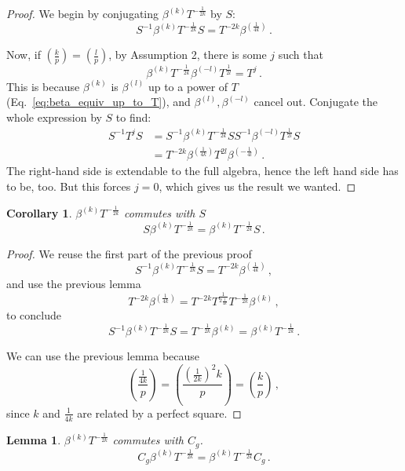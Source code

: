 \documentclass[aps,twocolumn,prx,floatfix,preprintnumbers, nofootinbib,10pt]{revtex4-2}
\numberwithin{equation}{section}
\newtheorem{lemma}[theorem]{Lemma}
\newtheorem{corollary}[theorem]{Corollary}
\theoremstyle{definition}
\theoremstyle{remark}
\theoremstyle{claim}
\newcommand{\be}{\begin{equation}}
\newcommand{\ee}{\end{equation}}
\newcommand{\paren}[1]{\left( #1 \right)}
\begin{document}
\begin{proof}
 We begin by conjugating $\beta^{(k)} T^{-\frac{1}{2k}}$ by $S$:
 \be
 S^{-1} \beta^{(k)} T^{-\frac{1}{2k}} S = T^{-2k} \beta^{(\frac{1}{4k})} \,.
 \ee


 Now, if $\paren{\frac{k}{p}} = \paren{\frac{l}{p}}$, by Assumption 2, there is some $j$ such that
 \be
 \beta^{(k)} T^{-\frac{1}{2k}} \beta^{(-l)} T^{\frac{1}{2l}} = T^j \,.
 \ee
 This is because $\beta^{(k)}$ is $\beta^{(l)}$ up to a power of $T$ (Eq.~\eqref{eq:beta_equiv_up_to_T}), and $\beta^{(l)}, \beta^{(-l)}$ cancel out. Conjugate the whole expression by $S$ to find:
 \begin{align}
  S^{-1} T^j S &= S^{-1} \beta^{(k)} T^{-\frac{1}{2k}} S S^{-1} \beta^{(-l)} T^{\frac{1}{2l}} S \nonumber \\
  &= T^{-2k} \beta^{(\frac{1}{4k})} T^{2l} \beta^{(-\frac{1}{4l})} \,. \label{eq: STjS}
 \end{align}
 The right-hand side is extendable to the full algebra, hence the left hand side has to be, too. But this forces $j = 0$, which gives us the result we wanted.
\end{proof}

\begin{corollary}\label{cor:betaT_commutes_with_S}
 $\beta^{(k)} T^{-\frac{1}{2k}}$ commutes with $S$
 \be\label{PecanPi}
 S \beta^{(k)} T^{-\frac{1}{2k}}  = \beta^{(k)} T^{-\frac{1}{2k}} S \,.
 \ee
\end{corollary}

\begin{proof}
 We reuse the first part of the previous proof
 \be
 S^{-1} \beta^{(k)} T^{-\frac{1}{2k}} S = T^{-2k} \beta^{(\frac{1}{4k})} \,,
 \ee
 and use the previous lemma
 \be
 T^{-2k} \beta^{(\frac{1}{4k})} = T^{-2k} T^{\frac{1}{2 \frac{1}{4k}}} T^{-\frac{1}{2k}} \beta^{(k)} \,,
 \ee
 to conclude
 \be
 S^{-1} \beta^{(k)} T^{-\frac{1}{2k}} S = T^{-\frac{1}{2k}} \beta^{(k)} = \beta^{(k)} T^{-\frac{1}{2k}} \,.
 \ee

 We can use the previous lemma because
 \be
 \paren{\frac{\frac{1}{4k}}{p}} = \paren{\frac{\paren{\frac{1}{2k}}^2 k}{p}} = \paren{\frac{k}{p}} \,,
 \ee
 since $k$ and $\frac{1}{4k}$ are related by a perfect square.
\end{proof}

\begin{lemma}\label{lem:betaT_commutes_with_Cg}
 $\beta^{(k)} T^{-\frac{1}{2k}}$ commutes with $C_g$.
 \be\label{WalnutPi}
 C_g \beta^{(k)} T^{-\frac{1}{2k}}  = \beta^{(k)} T^{-\frac{1}{2k}} C_g \,.
 \ee
\end{lemma}
\end{document}
